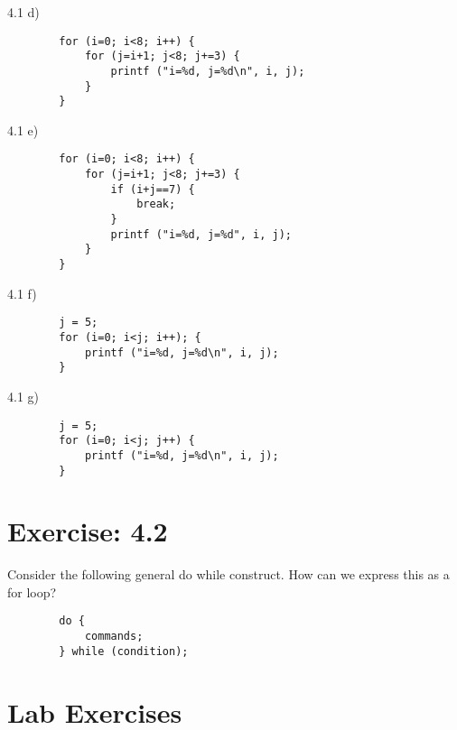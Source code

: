 \documentclass{beamer}
\begin{document}
\begin{frame}[fragile]{4.1 d)}
    \begin{verbatim}
        for (i=0; i<8; i++) {
            for (j=i+1; j<8; j+=3) {
                printf ("i=%d, j=%d\n", i, j);
            }
        }
    \end{verbatim}
\end{frame}

\begin{frame}[fragile]{4.1 e)}
    \begin{verbatim}
        for (i=0; i<8; i++) {
            for (j=i+1; j<8; j+=3) {
                if (i+j==7) {
                    break;
                }
                printf ("i=%d, j=%d", i, j);
            }
        }
    \end{verbatim}
\end{frame}

\begin{frame}[fragile]{4.1 f)}
    \begin{verbatim}
        j = 5;
        for (i=0; i<j; i++); {
            printf ("i=%d, j=%d\n", i, j);
        }
    \end{verbatim}
\end{frame}

\begin{frame}[fragile]{4.1 g)}
    \begin{verbatim}
        j = 5;
        for (i=0; i<j; j++) {
            printf ("i=%d, j=%d\n", i, j);
        }
    \end{verbatim}
\end{frame}

\section{Exercise: 4.2}

\begin{frame}[fragile]{4.2}
    Consider the following general do while construct. How can we express
    this as a for loop?
    \begin{verbatim}
        do {
            commands;
        } while (condition);
    \end{verbatim}
\end{frame}

\section{Lab Exercises}
\end{document}
